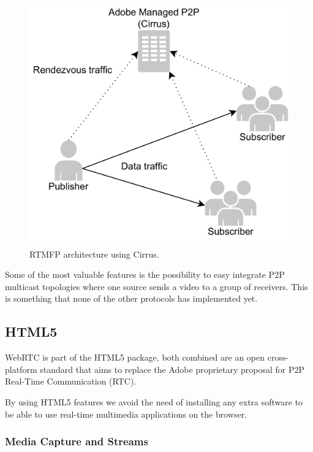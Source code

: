  \begin{figure}[h]
  \centering
    \includegraphics[scale=0.4]{./figures/cirrusAdobe.pdf}
      \caption[RTMFP architecture using Cirrus]{RTMFP architecture using Cirrus.}
	\label{fig:RTMFParchitecture}
\end{figure}
 
Some of the most valuable features is the possibility to easy integrate P2P multicast topologies where one source sends a video to a group of receivers. This is something that none of the other protocols has implemented yet.

\subsection{HTML5}

WebRTC is part of the HTML5 package, both combined are an open cross-platform standard that aims to replace the Adobe proprietary proposal for P2P Real-Time Communication (RTC).

By using HTML5 features we avoid the need of installing any extra software to be able to use real-time multimedia applications on the browser.

\subsubsection{Media Capture and Streams}

